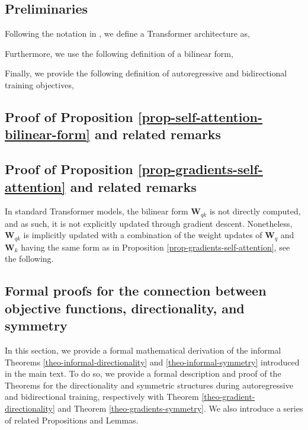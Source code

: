 
\subsection{Preliminaries}
%
Following the notation in \citep{vaswaniAttentionAllYou2017, radfordImprovingLanguageUnderstanding2018}, we define a Transformer architecture as,
%

%
Furthermore, we use the following definition of a bilinear form,

%
Finally, we provide the following definition of autoregressive and bidirectional training objectives,
%






\subsection{Proof of Proposition \ref{prop-self-attention-bilinear-form} and related remarks}
\label{supp-math-self-attention-bilinear-form}
%






\subsection{Proof of Proposition \ref{prop-gradients-self-attention} and related remarks}
\label{supp-math-gradients-self-attention}
%

%
In standard Transformer models, the bilinear form $\bm{W}_{qk}$ is not directly computed, and as such, it is not explicitly updated through gradient descent.
%
Nonetheless, $\bm{W}_{qk}$ is implicitly updated with a combination of the weight updates of $\bm{W}_q$ and $\bm{W}_k$ having the same form as in Proposition \ref{prop-gradients-self-attention}, see the following.
%




\subsection{Formal proofs for the connection between objective functions, directionality, and symmetry}
\label{supp-math-directionality-symmetry}
%
In this section, we provide a formal mathematical derivation of the informal Theorems \ref{theo-informal-directionality} and \ref{theo-informal-symmetry} introduced in the main text.
%
To do so, we provide a formal description and proof of the Theorems for the directionality and symmetric structures during autoregressive and bidirectional training, respectively with Theorem \ref{theo-gradient-directionality} and Theorem \ref{theo-gradients-symmetry}.
%
We also introduce a series of related Propositions and Lemmas.
%
%

